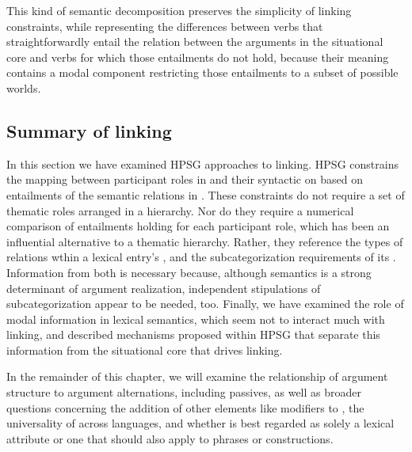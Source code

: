 \documentclass[output=paper
 	        ,biblatex
                ,babelshorthands
                ,newtxmath
                ,draftmode
                ,colorlinks, citecolor=brown
]{langscibook}
\begin{document}
 
This kind of semantic decomposition preserves the simplicity of linking constraints, while representing the differences between verbs that straightforwardly entail the relation between the arguments in the situational core and verbs for which those entailments do not hold, because their meaning contains a modal component restricting those entailments to a subset of possible worlds.


\subsection{Summary of linking}

In this section we have examined HPSG approaches to linking.  HPSG constrains the mapping between
participant roles in
 and their syntactic  on \argst{} based on entailments of the semantic
relations in .  These constraints do not require a set of thematic roles arranged in a
hierarchy.  Nor do they require a numerical comparison of entailments holding for each participant
role, which has been an influential alternative to a thematic hierarchy.  Rather, they reference the
types of relations wthin a lexical entry's , and the subcategorization requirements of
its \argst.  Information from both is necessary because, although semantics is a strong determinant
of argument realization, independent stipulations of subcategorization appear to be needed, too.
Finally, we have examined the role of modal information in lexical semantics, which seem not to
interact much with linking, and described mechanisms proposed within HPSG that separate this
information from the situational core that drives linking.

In the remainder of this chapter, we will examine the relationship of argument structure to argument
alternations, including passives, as well as broader questions concerning the addition of other
elements like modifiers to \argst, the universality of \argst across languages, and whether \argst
is best regarded as solely a lexical attribute or one that should also apply to phrases or
constructions.
\end{document}
